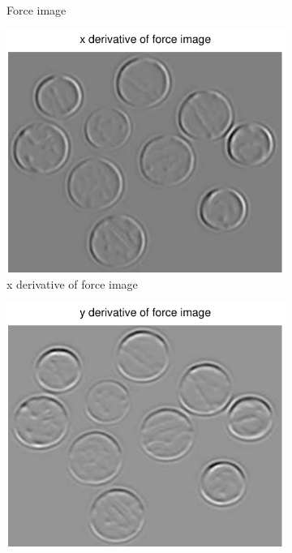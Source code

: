 \documentclass[11pt,a4paper]{article}
\begin{document}
\begin{figure}[H]
\begin{subfigure}[t]{0.24\textwidth}
        \caption{Force image}
        \label{fig:coins_log_forces}
    \end{subfigure}
    \begin{subfigure}[t]{0.24\textwidth}
        \includegraphics[width=\textwidth]{src/images/coins_log_xforces.pdf}
        \caption{x derivative of force image}
        \label{fig:coins_log_fx}
    \end{subfigure}
    \begin{subfigure}[t]{0.24\textwidth}
        \includegraphics[width=\textwidth]{src/images/coins_log_yforces.pdf}

\end{subfigure}
\end{figure}
\end{document}
